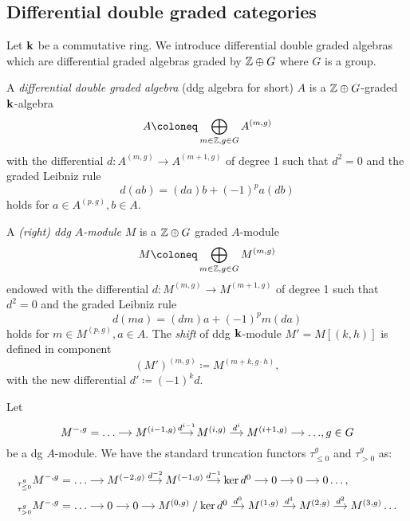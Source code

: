 \label{sec 3}

\subsection{Differential double graded categories}
Let $\mathbf{k}$ be a commutative ring.
We introduce differential double graded algebras
which are differential graded algebras graded by $\mathbb{Z} \oplus G$ where $G$ is a group.

\begin{definition}
  A \textit{differential double graded algebra} (ddg algebra for short)
  $A$ is a $\mathbb{Z} \oplus G$-graded $\mathbf{k}$-algebra
  \[ A \coloneq \bigoplus_{m \in \ZZ, g \in G} A^{(m, g)} \]
  with the differential $d \colon A^{(m, g)} \to A^{(m+1, g)}$
  of degree 1 such that $d^2 = 0$ and the graded Leibniz rule
  \[ d(ab) = (da)b + (-1)^pa(db) \]
  holds for $a \in A^{(p, g)}, b \in A.$
\end{definition}

\begin{definition}
  A \textit{(right) ddg $A$-module} $M$ is a $\mathbb{Z} \oplus G$ graded $A$-module
  \[ M \coloneq \bigoplus_{m \in \ZZ, g \in G} M^{(m, g)} \]
  endowed with the differential $d \colon M^{(m,g)} \to M^{(m+1,g)}$ of degree 1
  such that $d^2 = 0$ and the graded Leibniz rule
  \[ d(ma) = (dm)a + (-1)^pm(da) \]
  holds for $m \in M^{(p, g)}, a \in A$.
  The \textit{shift} of ddg $\mathbf{k}$-module $M' = M[(k, h)]$ is defined in component
  \[ (M')^{(m,g)} \coloneq M^{(m+k,g \cdot h)}, \]
  with the new differential $d' \coloneq (-1)^kd$.
\end{definition}

Let
\[
  M^{-, g} = 
  \begin{tikzcd}[cramped, column sep=small]
    \ldots \ar[r] & M^{(i-1, g)} \ar[r, "d^{i-1}"] & M^{(i,g)} \ar[r, "d^i"]
                  & M^{(i+1, g)} \ar[r] & \ldots
  \end{tikzcd}, g \in G
\]
be a dg $A$-module.
We have the standard truncation functors $\tau^g_{\leq 0}$ and $\tau^g_{> 0}$ as:
\begin{align*}
  {}_{\tau^g_{\leq 0}}M^{-,g} &=
  \begin{tikzcd}[cramped, column sep=small]
    \ldots \ar[r] & M^{(-2,g)} \ar[r, "d^{-2}"] & M^{(-1,g)} \ar[r, "d^{-1}"]
      & \ker d^0 \ar[r] & 0\ar[r] & 0\ar[r] & 0 \ldots,
  \end{tikzcd} \\
  {}_{\tau^g_{> 0}}M^{-,g} &=
  \begin{tikzcd}[cramped, column sep=small]
  \ldots \ar[r] & 0\ar[r] & 0\ar[r] & M^{(0,g)} \quot \ker d^0 \ar[r, "d^0"]
      & M^{(1,g)} \ar[r, "d^{1}"] & M^{(2,g)} \ar[r, "d^{2}"] & M^{(3,g)} \ldots
  \end{tikzcd}
\end{align*}

